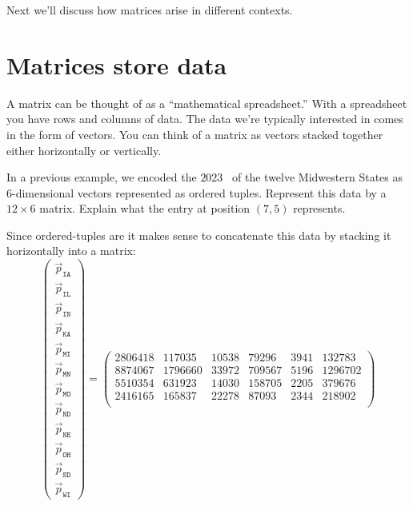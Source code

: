 \documentclass{ximera}
\begin{document}
Next we'll discuss how matrices arise in different contexts.


\section{Matrices store data}


A matrix can be thought of as a ``mathematical spreadsheet.'' With a
spreadsheet you have rows and columns of data.  The data we're
typically interested in comes in the form of vectors.  You can think
of a matrix as vectors stacked together either horizontally or
vertically.

\begin{example} %
  In a previous example, we encoded the $2023$
  ~of
  the twelve Midwestern States as $6$-dimensional vectors represented
  as ordered tuples. Represent this data by a $12\times 6$
  matrix. Explain what the entry at position $(7,5)$ represents.
  \begin{explanation}
  Since ordered-tuples are  it makes sense to
  concatenate this data by stacking it horizontally into a matrix:
  \[
  \begin{pmatrix}
  \vec{p}_{\texttt{IA}} \\
  \vec{p}_{\texttt{IL}} \\
  \vec{p}_{\texttt{IN}} \\
  \vec{p}_{\texttt{KA}} \\
  \vec{p}_{\texttt{MI}} \\
  \vec{p}_{\texttt{MN}} \\
  \vec{p}_{\texttt{MO}} \\
  \vec{p}_{\texttt{ND}} \\
  \vec{p}_{\texttt{NE}} \\
  \vec{p}_{\texttt{OH}} \\
  \vec{p}_{\texttt{SD}} \\
  \vec{p}_{\texttt{WI}}
  \end{pmatrix}
  =
  \begin{pmatrix}
  2806418 & 117035 & 10538 & 79296 & 3941 & 132783\\
  8874067 & 1796660 & 33972 & 709567 & 5196 & 1296702\\
  5510354 & 631923 & 14030 & 158705 & 2205 & 379676\\
  2416165 & 165837 & 22278 & 87093 & 2344 & 218902\\

\end{pmatrix}\]
\end{explanation}
\end{example}
\end{document}
